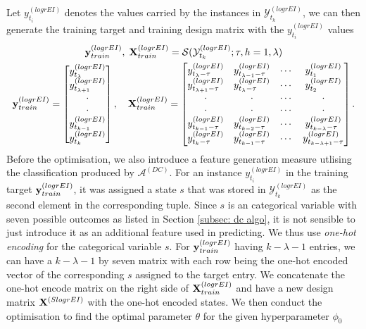Let $y^{(logrEI)}_{t_i}$ denotes the values carried by the instances in $\mathcal{Y}^{(logrEI)}_{t_k}$, we can then generate the training target and training design matrix with the $y^{(logrEI)}_{t_i}$ values
\begin{gather*}
    \mathbf{y}^{(logrEI)}_{train}, \; \mathbf{X}^{(logrEI)}_{train} = \mathcal{S} (\mathcal{Y}^{(logrEI)}_{t_k} ; \tau, h=1, \lambda) \\
    \mathbf{y}^{(logrEI)}_{train} = \begin{bmatrix}
        y^{(logrEI)}_{t_\lambda}       \\
        y^{(logrEI)}_{t_{\lambda + 1}} \\
        \cdot               \\
        \cdot               \\
        y^{(logrEI)}_{t_{k-1}}         \\
        y^{(logrEI)}_{t_k}             \\
    \end{bmatrix}
    , \quad
    \mathbf{X}^{(logrEI)}_{train} = \begin{bmatrix}
        y^{(logrEI)}_{t_{\lambda} - \tau}   & y^{(logrEI)}_{t_{\lambda-1} - \tau} & \cdots & y^{(logrEI)}_{t_{1}} \\
        y^{(logrEI)}_{t_{\lambda+1} - \tau} & y^{(logrEI)}_{t_{\lambda} - \tau}   & \cdots & y^{(logrEI)}_{t_{2}} \\
        \cdot                    & \cdot                    & \cdots & \cdot     \\
        \cdot                    & \cdot                    & \cdots & \cdot     \\
        y^{(logrEI)}_{t_{k-1} - \tau}       & y^{(logrEI)}_{t_{k-2} - \tau}       & \cdots & y^{(logrEI)}_{t_{k - \lambda} - \tau}     \\
        y^{(logrEI)}_{t_{k} - \tau}         & y^{(logrEI)}_{t_{k-1} - \tau}       & \cdots & y^{(logrEI)}_{t_{k - \lambda + 1} - \tau} \\
    \end{bmatrix}.
\end{gather*}
Before the optimisation, we also introduce a feature generation measure utlising the classification produced by $\mathcal{A}^{(DC)}$. For an instance $y^{(logrEI)}_{t_i}$ in the training target $\mathbf{y}^{(logrEI)}_{train}$, it was assigned a state $s$ that was stored in $\mathcal{Y}^{(logrEI)}_{t_k}$ as the second element in the corresponding tuple. Since $s$ is an categorical variable with seven possible outcomes as listed in Section \ref{subsec: dc algo}, it is not sensible to just introduce it as an additional feature used in predicting. We thus use \textit{one-hot encoding} for the categorical variable $s$. For $\mathbf{y}^{(logrEI)}_{train}$ having $k - \lambda - 1$ entries, we can have a $k - \lambda - 1$ by seven matrix with each row being the one-hot encoded vector of the corresponding $s$ assigned to the target entry. We concatenate the one-hot encode matrix on the right side of $\mathbf{X}^{(logrEI)}_{train}$ and have a new design matrix $\mathbf{X}^{(SlogrEI)}$ with the one-hot encoded states. We then conduct the optimisation to find the optimal parameter $\theta$ for the given hyperparameter $\phi_0$
